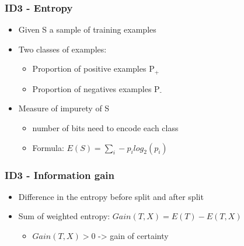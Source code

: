\documentclass{beamer}
\begin{document}
\begin{frame}
\frametitle{ID3 - Entropy}
\begin{itemize}
		\item  Given S a sample of training examples
		\item Two classes of examples:
		\begin{itemize}
			\item Proportion of positive examples $\textrm{P}_\textrm{+}$
			\item Proportion of negatives examples $\textrm{P}_\textrm{-}$
		\end{itemize}
		\item Measure of impurety of S
		\begin{itemize}
			\item number of bits need to encode each class
			\item Formula: $E(S)= \sum_{i}{} - p_i log_2(p_i) $
		\end{itemize}

	\end{itemize}
\end{frame}

\begin{frame}
\frametitle{ID3 - Information gain}
\begin{itemize}
		\item  Difference in the entropy before split and after split 
		\item Sum of weighted entropy:  $Gain(T,X)=E(T)-E(T,X)$
		\begin{itemize}
			\item $Gain(T,X)> 0$ -> gain of certainty
			
		\end{itemize}

	\end{itemize}
\end{frame}
\end{document}
